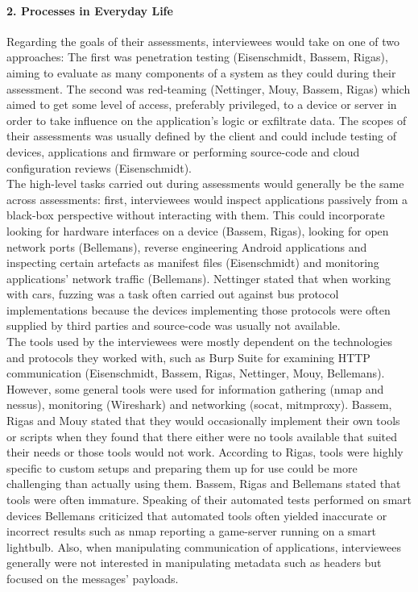 \paragraph{2. Processes in Everyday Life} Regarding the goals of their assessments, interviewees would take on one of two approaches: The first was penetration testing (Eisenschmidt, Bassem, Rigas), aiming to evaluate as many components of a system as they could during their assessment. The second was red-teaming (Nettinger, Mouy, Bassem, Rigas) which aimed to get some level of access, preferably privileged, to a device or server in order to take influence on the application's logic or exfiltrate data. The scopes of their assessments was usually defined by the client and could include testing of devices, applications and firmware or performing source-code and cloud configuration reviews (Eisenschmidt).\\
The high-level tasks carried out during assessments would generally be the same across assessments: first, interviewees would inspect applications passively from a black-box perspective without interacting with them. This could incorporate looking for hardware interfaces on a device (Bassem, Rigas), looking for open network ports (Bellemans), reverse engineering Android applications and inspecting certain artefacts as manifest files (Eisenschmidt) and monitoring applications' network traffic (Bellemans). Nettinger stated that when working with cars, fuzzing was a task often carried out against bus protocol implementations because the devices implementing those protocols were often supplied by third parties and source-code was usually not available.\\
The tools used by the interviewees were mostly dependent on the technologies and protocols they worked with, such as Burp Suite for examining \ac{HTTP} communication (Eisenschmidt, Bassem, Rigas, Nettinger, Mouy, Bellemans). However, some general tools were used for information gathering (nmap and nessus), monitoring (Wireshark) and networking (socat, mitmproxy). Bassem, Rigas and Mouy stated that they would occasionally implement their own tools or scripts when they found that there either were no tools available that suited their needs or those tools would not work. According to Rigas, tools were highly specific to custom setups and preparing them up for use could be more challenging than actually using them. Bassem, Rigas and Bellemans stated that tools were often immature. Speaking of their automated tests performed on smart devices Bellemans criticized that automated tools often yielded inaccurate or incorrect results such as nmap reporting a game-server running on a smart lightbulb. Also, when manipulating communication of applications, interviewees generally were not interested in manipulating metadata such as headers but focused on the messages' payloads.

